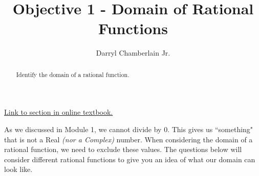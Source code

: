 \documentclass{ximera}
\author{Darryl Chamberlain Jr.}
\title{Objective 1 - Domain of Rational Functions}
\begin{document}
\begin{abstract}
Identify the domain of a rational function.
\end{abstract}
\maketitle

\href{https://cnx.org/contents/mwjClAV_@8.1:KNTP2r7D@13/Rational-Functions}{Link to section in online textbook.}


As we discussed in Module 1, we cannot divide by 0. This gives us ``something" that is not a Real \textit{(nor a Complex)} number. When considering the domain of a rational function, we need to exclude these values. The questions below will consider different rational functions to give you an idea of what our domain can look like. 
\end{document}
